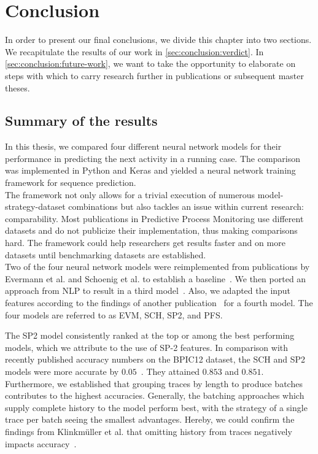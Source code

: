 \chapter{Conclusion} \label{chap:conclusion}
In order to present our final conclusions, we divide this chapter into two sections.
We recapitulate the results of our work in \autoref{sec:conclusion:verdict}.
In \autoref{sec:conclusion:future-work}, we want to take the opportunity to elaborate on steps with which to carry research further in publications or subsequent master theses.

\section{Summary of the results} \label{sec:conclusion:verdict}
In this thesis, we compared four different neural network models for their performance in predicting the next activity in a running case. The comparison was implemented in Python and Keras and yielded a neural network training framework for sequence prediction.\\

The framework not only allows for a trivial execution of numerous model-strategy-dataset combinations but also tackles an issue within current research: comparability. Most publications in Predictive Process Monitoring use different datasets and do not publicize their implementation, thus making comparisons hard. The framework could help researchers get results faster and on more datasets until benchmarking datasets are established.\\

Two of the four neural network models were reimplemented from publications by Evermann et al. and Schoenig et al. to establish a baseline~\cite{evermann2016, schoenig2018}. We then ported an approach from NLP to result in a third model~\cite{shibata2016bipartite}. Also, we adapted the input features according to the findings of another publication~\cite{klinkmuller2018reliablemonitoring} for a fourth model. The four models are referred to as EVM, SCH, SP2, and PFS.

The SP2 model consistently ranked at the top or among the best performing models, which we attribute to the use of SP-2 features. In comparison with recently published accuracy numbers on the BPIC12 dataset, the SCH and SP2 models were more accurate by $0.05$~\cite{boehmer2018probability, evermann2016}. They attained $0.853$ and $0.851$. Furthermore, we established that grouping traces by length to produce batches contributes to the highest accuracies. Generally, the batching approaches which supply complete history to the model perform best, with the strategy of a single trace per batch seeing the smallest advantages. Hereby, we could confirm the findings from Klinkmüller et al. that omitting history from traces negatively impacts accuracy~\cite{klinkmuller2018reliablemonitoring}.

